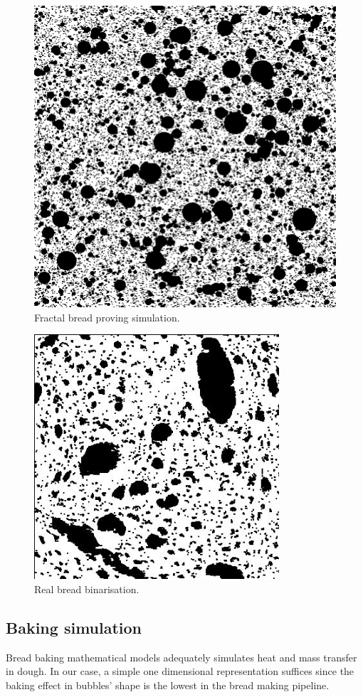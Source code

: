 \documentclass[final,5p,times]{elsarticle}
\begin{document}
\begin{figure}
\includegraphics[scale=0.28]{bubbles.png}
\caption{Fractal bread proving simulation.}
\label{FigProving}
\end{figure}

\begin{figure}
\includegraphics[scale=0.67]{realbin.png}
\caption{Real bread binarisation.}
\label{FigBreadbin}
\end{figure}

\subsection{Baking simulation}
Bread baking mathematical models adequately simulates heat and mass transfer in dough. In our case, a simple one dimensional representation suffices \cite{Powathil2004,Purlis2010}  since the baking effect in bubbles' shape is the lowest in the bread making pipeline. 
\end{document}
